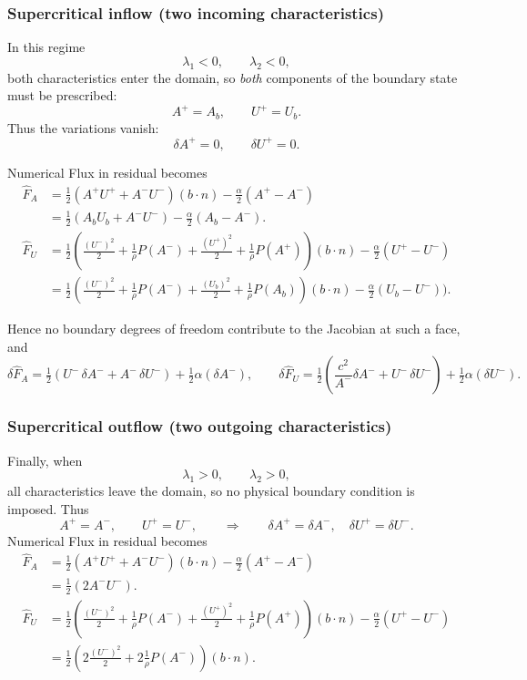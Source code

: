\documentclass[11pt]{article}
\begin{document}
\subsubsection{Supercritical inflow (two incoming characteristics)}

In this regime
\[
  \lambda_1 < 0,\qquad \lambda_2 < 0,
\]
both characteristics enter the domain, so \emph{both} components of the
boundary state must be prescribed:
\[
  A^+ = A_b, \qquad U^+ = U_b.
\]
Thus the variations vanish:
\[
  \delta A^+ = 0, \qquad \delta U^+ = 0.
\]

Numerical Flux in residual becomes 
\begin{align*}
 \widehat{F}_A &= \tfrac{1}{2} (A^{+} U^{+}  + A^{-}U^{-})(b \cdot n) - \tfrac{\alpha}{2}(A^{+} - A^{-})\\
 & = \frac{1}{2}(A_b U_b + A^{-}U^{-}) - \tfrac{\alpha}{2}(A_b - A^{-}).\\
\widehat{F}_U &= \tfrac{1}{2} \left(\frac{(U^-)^2}{2} + \frac{1}{\rho}P(A^-) + \frac{(U^+)^2}{2} + \frac{1}{\rho}P(A^+)\right)(b \cdot n) -\tfrac{\alpha}{2}(U^+ - U^-) \\
& = \frac{1}{2}\left( \frac{(U^-)^2}{2} +\frac{1}{\rho} P(A^-) + \frac{(U_b)^2}{2} +\frac{1}{\rho} P(A_b)\right) (b\cdot n) - \tfrac{\alpha}{2}(U_b -U^{-})).
\end{align*}

Hence no boundary degrees of freedom contribute to the Jacobian at such a face,
and
\[
\delta\widehat{F}_A
=
\tfrac12\left(U^-\,\delta A^- + A^-\,\delta U^-\right)
+ \tfrac12\alpha (\delta A^-),
\qquad
\delta\widehat{F}_U
=
\tfrac12\left(\frac{c^2}{A^-}\delta A^- + U^-\,\delta U^-\right)
+ \tfrac12\alpha (\delta U^-).
\]

\subsubsection{Supercritical outflow (two outgoing characteristics)}

Finally, when
\[
  \lambda_1 > 0,\qquad \lambda_2 > 0 ,
\]
all characteristics leave the domain, so no physical boundary condition is
imposed.  Thus
\[
  A^+ = A^-,\qquad U^+ = U^-,
\qquad\Longrightarrow\qquad
  \delta A^+ = \delta A^-,\quad
  \delta U^+ = \delta U^- .
\]
Numerical Flux in residual becomes 
\begin{align*}
 \widehat{F}_A &= \tfrac{1}{2} (A^{+} U^{+}  + A^{-}U^{-})(b \cdot n) - \tfrac{\alpha}{2}(A^{+} - A^{-})\\
 & = \frac{1}{2}( 2 A^{-}U^{-}).\\
\widehat{F}_U &= \tfrac{1}{2} \left(\frac{(U^-)^2}{2} + \frac{1}{\rho}P(A^-) + \frac{(U^+)^2}{2} + \frac{1}{\rho}P(A^+)\right)(b \cdot n) -\tfrac{\alpha}{2}(U^+ - U^-) \\
& = \frac{1}{2}\left( 2 \frac{(U^-)^2}{2} + 2\frac{1}{\rho} P(A^-) \right) (b\cdot n).
\end{align*}
\end{document}
